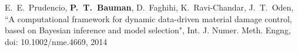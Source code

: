 E.~E.~Prudencio, \textbf{P.~T.~Bauman}, D.~Faghihi, K.~Ravi-Chandar, J.~T.~Oden,
``A computational framework for dynamic data-driven material damage control,
based on Bayesian inference and model selection",
Int. J. Numer. Meth. Engng, doi: 10.1002/nme.4669, 2014

